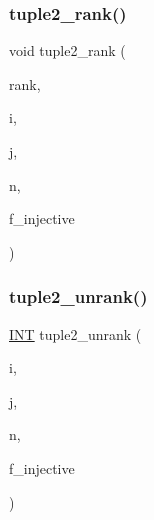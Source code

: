 \mbox{\label{global_8_c_af8f305151bfcd65674783ea6d567fc9f}} 
\subsubsection{\texorpdfstring{tuple2\+\_\+rank()}{tuple2\_rank()}}
{\footnotesize\ttfamily void tuple2\+\_\+rank (\begin{DoxyParamCaption}\item[{\mbox{\hyperlink{galois_8h_a09fddde158a3a20bd2dcadb609de11dc}{I\+NT}}}]{rank,  }\item[{\mbox{\hyperlink{galois_8h_a09fddde158a3a20bd2dcadb609de11dc}{I\+NT}} \&}]{i,  }\item[{\mbox{\hyperlink{galois_8h_a09fddde158a3a20bd2dcadb609de11dc}{I\+NT}} \&}]{j,  }\item[{\mbox{\hyperlink{galois_8h_a09fddde158a3a20bd2dcadb609de11dc}{I\+NT}}}]{n,  }\item[{\mbox{\hyperlink{galois_8h_a09fddde158a3a20bd2dcadb609de11dc}{I\+NT}}}]{f\+\_\+injective }\end{DoxyParamCaption})}

\mbox{\label{global_8_c_a6fb1497bb7e4bedd98cad36064580b1c}} 
\subsubsection{\texorpdfstring{tuple2\+\_\+unrank()}{tuple2\_unrank()}}
{\footnotesize\ttfamily \mbox{\hyperlink{galois_8h_a09fddde158a3a20bd2dcadb609de11dc}{I\+NT}} tuple2\+\_\+unrank (\begin{DoxyParamCaption}\item[{\mbox{\hyperlink{galois_8h_a09fddde158a3a20bd2dcadb609de11dc}{I\+NT}}}]{i,  }\item[{\mbox{\hyperlink{galois_8h_a09fddde158a3a20bd2dcadb609de11dc}{I\+NT}}}]{j,  }\item[{\mbox{\hyperlink{galois_8h_a09fddde158a3a20bd2dcadb609de11dc}{I\+NT}}}]{n,  }\item[{\mbox{\hyperlink{galois_8h_a09fddde158a3a20bd2dcadb609de11dc}{I\+NT}}}]{f\+\_\+injective }\end{DoxyParamCaption})}

